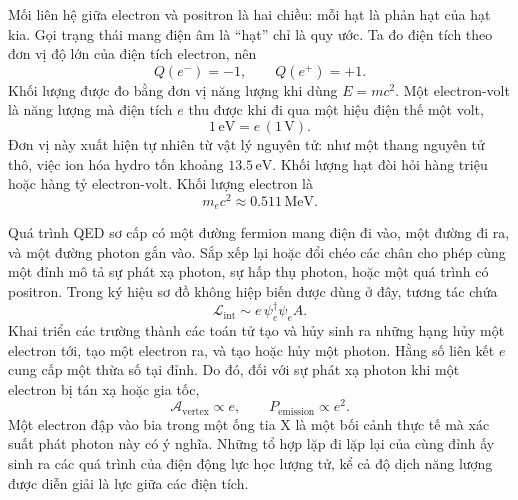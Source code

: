 Mối liên hệ giữa electron và positron là hai chiều: mỗi hạt là phản hạt của hạt kia. Gọi trạng thái mang điện âm là ``hạt'' chỉ là quy ước. Ta đo điện tích theo đơn vị độ lớn của điện tích electron, nên
\begin{equation}
Q(e^-)=-1,\qquad Q(e^+)=+1.
\end{equation}
Khối lượng được đo bằng đơn vị năng lượng khi dùng \(E=mc^2\). Một electron-volt là năng lượng mà điện tích \(e\) thu được khi đi qua một hiệu điện thế một volt,
\begin{equation}
1\,\mathrm{eV}=e\,(1\,\mathrm V).
\end{equation}
Đơn vị này xuất hiện tự nhiên từ vật lý nguyên tử: như một thang nguyên tử thô, việc ion hóa hydro tốn khoảng \(13.5\,\mathrm{eV}\). Khối lượng hạt đòi hỏi hàng triệu hoặc hàng tỷ electron-volt. Khối lượng electron là
\begin{equation}
m_e c^2 \approx 0.511\,\mathrm{MeV}.
\end{equation}

\begin{classroomqa}
\end{classroomqa}

Quá trình QED sơ cấp có một đường fermion mang điện đi vào, một đường đi ra, và một đường photon gắn vào. Sắp xếp lại hoặc đổi chéo các chân cho phép cùng một đỉnh mô tả sự phát xạ photon, sự hấp thụ photon, hoặc một quá trình có positron. Trong ký hiệu sơ đồ không hiệp biến được dùng ở đây, tương tác chứa
\begin{equation}
\mathcal{L}_{\mathrm{int}}\sim e\,\psi_e^\dagger \psi_e A.
\end{equation}
Khai triển các trường thành các toán tử tạo và hủy sinh ra những hạng hủy một electron tới, tạo một electron ra, và tạo hoặc hủy một photon. Hằng số liên kết \(e\) cung cấp một thừa số tại đỉnh. Do đó, đối với sự phát xạ photon khi một electron bị tán xạ hoặc gia tốc,
\begin{equation}
\mathcal{A}_{\mathrm{vertex}}\propto e,
\qquad
P_{\mathrm{emission}}\propto e^2.
\end{equation}
Một electron đập vào bia trong một ống tia X là một bối cảnh thực tế mà xác suất phát photon này có ý nghĩa. Những tổ hợp lặp đi lặp lại của cùng đỉnh ấy sinh ra các quá trình của điện động lực học lượng tử, kể cả độ dịch năng lượng được diễn giải là lực giữa các điện tích.

